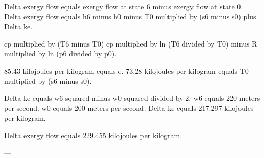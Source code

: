 Delta exergy flow equals exergy flow at state 6 minus exergy flow at state 0.  
Delta exergy flow equals h6 minus h0 minus T0 multiplied by (s6 minus s0) plus Delta ke.  

cp multiplied by (T6 minus T0)  
cp multiplied by ln (T6 divided by T0) minus R multiplied by ln (p6 divided by p0).  

85.43 kilojoules per kilogram equals c.  
73.28 kilojoules per kilogram equals T0 multiplied by (s6 minus s0).  

Delta ke equals w6 squared minus w0 squared divided by 2.  
w6 equals 220 meters per second.  
w0 equals 200 meters per second.  
Delta ke equals 217.297 kilojoules per kilogram.  

Delta exergy flow equals 229.455 kilojoules per kilogram.  

---